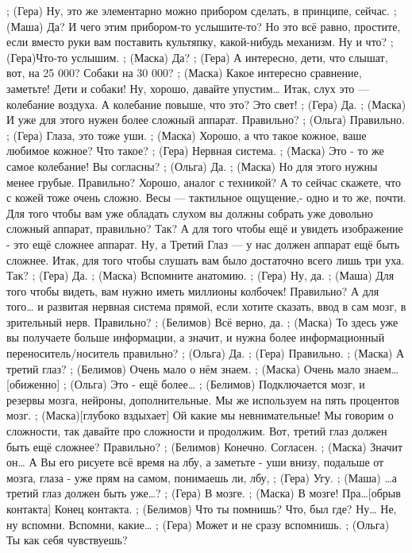 ;	(Гера) Ну, это же элементарно можно прибором сделать, в принципе, сейчас.
;	(Маша) Да? И чего этим прибором-то услышите-то? Но это всё равно, простите, если вместо руки вам поставить культяпку, какой-нибудь механизм. Ну и что?
;	(Гера)Что-то услышим.
;	(Маска) Да?
;	(Гера) А интересно, дети, что слышат, вот, на 25 000? Собаки на 30 000?
;	(Маска) Какое интересно сравнение, заметьте! Дети и собаки! Ну, хорошо, давайте упустим… Итак, слух это — колебание воздуха. А колебание повыше, что это? Это свет!
;	(Гера) Да.
;	(Маска) И уже для этого нужен более сложный аппарат. Правильно?
;	(Ольга) Правильно.
;	(Гера) Глаза, это тоже уши.
;	(Маска) Хорошо, а что такое кожное, ваше любимое кожное? Что такое? 
;	(Гера) Нервная система.
;	(Маска) Это - то же самое колебание! Вы согласны?
;	(Ольга) Да.
;	(Маска) Но для этого нужны менее грубые. Правильно? Хорошо, аналог с техникой? А то сейчас скажете, что с кожей тоже очень сложно. Весы — тактильное ощущение,-  одно и то же, почти. Для того чтобы вам уже обладать слухом вы должны собрать уже довольно сложный аппарат, правильно? Так? А для того чтобы ещё и увидеть изображение - это ещё сложнее аппарат. Ну, а Третий Глаз — у нас должен аппарат ещё быть сложнее. Итак, для того чтобы слушать вам было достаточно всего лишь три уха. Так? 
;	(Гера) Да.
;	(Маска) Вспомните анатомию.
;	(Гера) Ну, да.
;	(Маша) Для того чтобы видеть, вам нужно иметь миллионы колбочек! Правильно? А для того… и развитая нервная система прямой, если хотите сказать, ввод в сам мозг, в зрительный нерв. Правильно?
;	(Белимов) Всё верно, да.
;	(Маска) То здесь уже вы получаете больше информации, а значит, и нужна более информационный переноситель/носитель правильно?
;	(Ольга) Да.
;	(Гера)  Правильно.
;	(Маска) А третий глаз? 
;	(Белимов) Очень мало о нём знаем.
;	(Маска) Очень мало знаем…[обиженно]
;	(Ольга) Это - ещё более…
;	(Белимов) Подключается мозг, и резервы мозга, нейроны, дополнительные. Мы же используем на пять процентов мозг.
;	(Маска)[глубоко вздыхает] Ой какие мы невнимательные! Мы говорим о сложности, так давайте про сложности и продолжим. Вот, третий глаз должен быть ещё сложнее? Правильно?
;	(Белимов) Конечно. Согласен.
;	(Маска) Значит он… А Вы его рисуете всё время на лбу, а заметьте - уши внизу, подальше от мозга, глаза - уже прям на самом, понимаешь ли, лбу,
;	(Гера)  Угу.
;	(Маша) …а третий глаз должен быть уже…?
;	(Гера)  В мозге.
;	(Маска) В мозге! Пра…[обрыв контакта]
          Конец контакта.
;	(Белимов) Что ты помнишь? Что, был где? Ну… Не, ну вспомни. Вспомни, какие…
;	(Гера) Может и не сразу вспомнишь.
;	(Ольга) Ты как себя чувствуешь?

